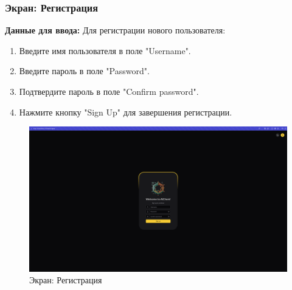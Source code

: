 \documentclass[a4paper,12pt,reqno]{article}
\begin{document}
\subsubsection{Экран: Регистрация}
\textbf{Данные для ввода:}  
Для регистрации нового пользователя:
\begin{enumerate}
    \item Введите имя пользователя в поле "Username".
    \item Введите пароль в поле "Password".
    \item Подтвердите пароль в поле "Confirm password".
    \item Нажмите кнопку "Sign Up" для завершения регистрации.
\end{enumerate}
\begin{figure}[H]
    \centering
    \includegraphics[width=\textwidth]{RO/img/signup.png} %
    \caption{Экран: Регистрация}
    \label{fig:signup}
\end{figure}
\end{document}
